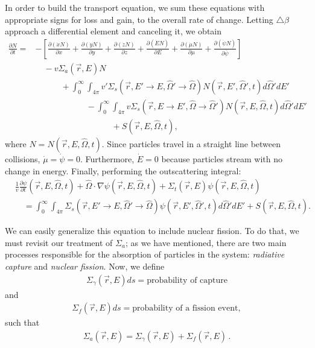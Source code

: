 \documentclass[12pt]{article}
\newcommand{\rvec}{\ensuremath{\vec{r}}}
\newcommand{\omvec}{\ensuremath{\hat{\Omega}}}
\begin{document}
 In order to build the transport equation, we sum these equations with appropriate signs
for loss and gain, to the overall rate of change. Letting $\triangle \beta$ approach a differential
element and canceling it, we obtain
\begin{align}
\frac{\partial N}{\partial t} =& -\left[\frac{\partial (\dot x N)}{\partial x} +
\frac{\partial (\dot y N)}{\partial y}+\frac{\partial (\dot z N)}{\partial z} +
\frac{\partial (\dot E N)}{\partial E}+\frac{\partial (\dot \mu N)}{\partial \mu}+
\frac{\partial (\dot \psi N)}{\partial \overline\psi}\right] 
\\ & \quad - v\Sigma_a(\rvec,E)N \nonumber
 \\& \quad\quad\quad   + 
\int_0^{\infty}\int_{4\pi}v'\Sigma_s(\rvec, E'\rightarrow E,\omvec'\rightarrow\omvec)N(\rvec,E',\omvec',t) d\omvec'dE'\nonumber 
\\& \quad\quad\quad\quad\quad\quad -\int_0^{\infty}\int_{4\pi}v\Sigma_s(\rvec, E\rightarrow E',\omvec\rightarrow\omvec')N(\rvec,E,\omvec,t) d\omvec'dE'\nonumber
\\& \quad\quad\quad\quad\quad\quad\quad\quad\quad
+S(\rvec,E,\omvec,t),\nonumber
\end{align}
 where $N = N(\rvec,E,\omvec,t)$. Since particles travel in a straight line
between collisions, \linebreak
$\dot \mu = \dot \psi = 0$. Furthermore, $\dot E = 0$ because particles stream
with no change in energy. Finally, performing the outscattering integral:
\begin{align}
&\frac{1}{v}\frac{\partial \psi}{\partial t}(\rvec,E,\omvec,t) + \omvec\cdot  \nabla \psi(\rvec,E,\omvec,t) +
 \Sigma_t(\rvec,E)\psi(\rvec,E,\omvec,t)
\\& \quad =
\int_0^{\infty}\int_{4\pi}\Sigma_s(\rvec, E'\rightarrow E,\omvec'\rightarrow\omvec)
\psi(\rvec,E',\omvec',t)d\omvec'dE'+S(\rvec, E, \omvec,t) \nonumber.
\end{align}

We can easily generalize this equation to include nuclear fission.
To do that, we must revisit our treatment of $\Sigma_a$; as we have mentioned, there are two main processes responsible for the absorption of particles in the system: \textit{radiative capture} and \textit{nuclear fission}. Now, we define
\begin{align*}
\Sigma_\gamma(\rvec,E)ds = \textrm{probability of capture}
\end{align*}
and
\begin{align*}
\Sigma_f(\rvec,E)ds = \textrm{probability of a fission event},
\end{align*}
such that
\begin{align*}
\Sigma_a(\rvec,E) = \Sigma_\gamma(\rvec,E) + \Sigma_f(\rvec,E)\,.
\end{align*}
\end{document}
